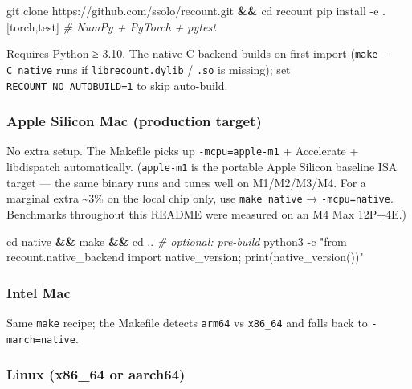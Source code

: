 \documentclass[
  10pt,
]{article}
\newenvironment{Shaded}{}{}
\newcommand{\AttributeTok}[1]{\textcolor[rgb]{0.49,0.56,0.16}{#1}}
\newcommand{\BuiltInTok}[1]{\textcolor[rgb]{0.00,0.50,0.00}{#1}}
\newcommand{\CommentTok}[1]{\textcolor[rgb]{0.38,0.63,0.69}{\textit{#1}}}
\newcommand{\ExtensionTok}[1]{#1}
\newcommand{\FunctionTok}[1]{\textcolor[rgb]{0.02,0.16,0.49}{#1}}
\newcommand{\KeywordTok}[1]{\textcolor[rgb]{0.00,0.44,0.13}{\textbf{#1}}}
\newcommand{\NormalTok}[1]{#1}
\newcommand{\StringTok}[1]{\textcolor[rgb]{0.25,0.44,0.63}{#1}}
\begin{document}
\begin{Shaded}
\begin{Highlighting}[]
\FunctionTok{git}\NormalTok{ clone https://github.com/ssolo/recount.git }\KeywordTok{\&\&} \BuiltInTok{cd}\NormalTok{ recount}
\ExtensionTok{pip}\NormalTok{ install }\AttributeTok{{-}e} \StringTok{\textquotesingle{}.[torch,test]\textquotesingle{}}        \CommentTok{\# NumPy + PyTorch + pytest}
\end{Highlighting}
\end{Shaded}

Requires Python ≥ 3.10. The native C backend builds on first import
(\texttt{make\ -C\ native} runs if \texttt{librecount.dylib} /
\texttt{.so} is missing); set \texttt{RECOUNT\_NO\_AUTOBUILD=1} to skip
auto-build.

\subsubsection{Apple Silicon Mac (production
target)}\label{apple-silicon-mac-production-target}

No extra setup. The Makefile picks up \texttt{-mcpu=apple-m1} +
Accelerate + libdispatch automatically. (\texttt{apple-m1} is the
portable Apple Silicon baseline ISA target --- the same binary runs and
tunes well on M1/M2/M3/M4. For a marginal extra \textasciitilde3\% on
the local chip only, use \texttt{make\ native} → \texttt{-mcpu=native}.
Benchmarks throughout this README were measured on an M4 Max 12P+4E.)

\begin{Shaded}
\begin{Highlighting}[]
\BuiltInTok{cd}\NormalTok{ native }\KeywordTok{\&\&} \FunctionTok{make} \KeywordTok{\&\&} \BuiltInTok{cd}\NormalTok{ ..              }\CommentTok{\# optional: pre{-}build}
\ExtensionTok{python3} \AttributeTok{{-}c} \StringTok{"from recount.native\_backend import native\_version; print(native\_version())"}
\end{Highlighting}
\end{Shaded}

\subsubsection{Intel Mac}\label{intel-mac}

Same \texttt{make} recipe; the Makefile detects \texttt{arm64} vs
\texttt{x86\_64} and falls back to \texttt{-march=native}.

\subsubsection{Linux (x86\_64 or
aarch64)}\label{linux-x86_64-or-aarch64}
\end{document}
